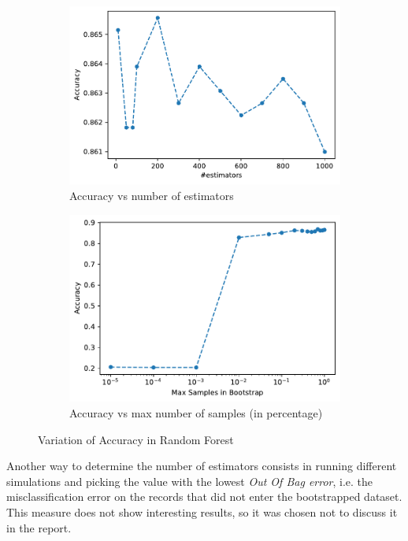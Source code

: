 \documentclass[10pt, a4paper, twocolumn]{article}
\begin{document}
\begin{figure}

    \centering
    \begin{subfigure}[t]{0.49\columnwidth}
    \includegraphics[width=\linewidth]{RF_accuracy.pdf}
    \caption{Accuracy vs number of estimators}
    \label{fig:accuracy_rf}
\end{subfigure}
  \hfill %
\begin{subfigure}[t]{0.49\columnwidth}
    \centering
    \includegraphics[width=\linewidth]{RF_maxsamples.pdf}
    \caption{Accuracy vs max number of samples (in percentage)}
    \label{fig:maxsamples_rf}
    \end{subfigure}
    \caption{Variation of Accuracy in Random Forest}
    
\end{figure}

Another way to determine the number of estimators consists in running different simulations and picking the value with the lowest \textit{Out Of Bag error}, i.e. the misclassification error on the records that did not enter the bootstrapped dataset.
This measure does not show interesting results, so it was chosen not to discuss it in the report.
\end{document}
